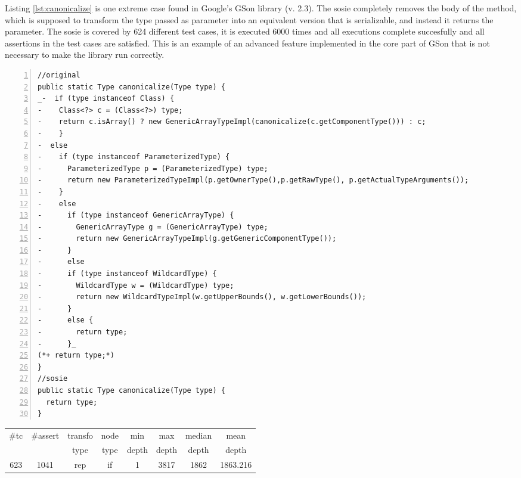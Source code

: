 Listing \ref{lst:canonicalize} is one extreme case found in Google's GSon library (v. 2.3). 
The sosie completely removes the body of the method, which is supposed to transform the type passed as parameter into an equivalent version that is serializable, and instead it returns the parameter. 
The sosie is covered by 624 different test cases, it is executed 6000 times and all executions complete succesfully and all assertions in the test cases are satisfied. 
This is an example of an advanced feature implemented in the core part of GSon that is not necessary to make the library run correctly.

\begin{minipage}{\columnwidth}
\begin{lstlisting}[caption={\texttt{canonicalize} in GSon and a sosie},label={lst:canonicalize},numbers=left]
//original
public static Type canonicalize(Type type) {
_-  if (type instanceof Class) {
-    Class<?> c = (Class<?>) type;
-    return c.isArray() ? new GenericArrayTypeImpl(canonicalize(c.getComponentType())) : c;
-    } 
-  else 
-    if (type instanceof ParameterizedType) {
-      ParameterizedType p = (ParameterizedType) type;
-      return new ParameterizedTypeImpl(p.getOwnerType(),p.getRawType(), p.getActualTypeArguments());
-    } 
-    else 
-      if (type instanceof GenericArrayType) {
-        GenericArrayType g = (GenericArrayType) type;
-        return new GenericArrayTypeImpl(g.getGenericComponentType());
-      } 
-      else 
-      if (type instanceof WildcardType) {
-        WildcardType w = (WildcardType) type;
-        return new WildcardTypeImpl(w.getUpperBounds(), w.getLowerBounds());
-      } 
-      else {
-        return type;
-      }_
(*+ return type;*)
}
//sosie
public static Type canonicalize(Type type) {
  return type;
}
\end{lstlisting}
\tabcolsep=0.11cm
\begin{tabular}{>{\small}c>{\small}c>{\small}c>{\small}c>{\small}c>{\small}c>{\small}c>{\small}c}
\hline
\rowcolor{lightgray} \#tc & \#assert & transfo & node & min & max & median & mean   \\
\rowcolor{lightgray}  & & type & type & depth  & depth & depth & depth  \\ 
\hline
623 & 1041 & rep & if  &1  &3817  &1862  &1863.216 \\
\hline
\end{tabular}
\end{minipage}